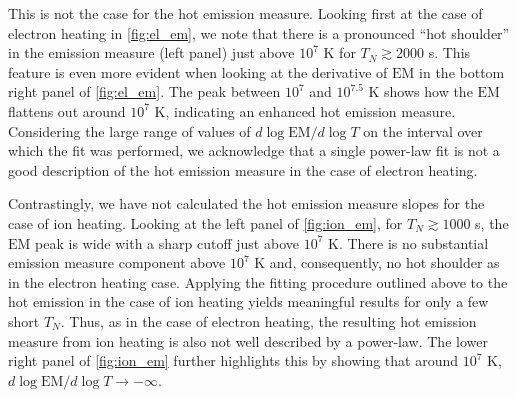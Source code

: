 \documentclass[apj]{emulateapj}
\begin{document}
	\par This is not the case for the hot emission measure. Looking first at the case of electron heating in \autoref{fig:el_em}, we note that there is a pronounced ``hot shoulder'' in the emission measure (left panel) just above $10^7$ K for $T_N\gtrsim2000$ s. This feature is even more evident when looking at the derivative of $\mathrm{EM}$ in the bottom right panel of \autoref{fig:el_em}. The peak between $10^7$ and $10^{7.5}$ K shows how the $\mathrm{EM}$ flattens out around $10^7$ K, indicating an enhanced hot emission measure. Considering the large range of values of $d\log{\mathrm{EM}}/d\log{T}$ on the interval over which the fit was performed, we acknowledge that a single power-law fit is not a good description of the hot emission measure in the case of electron heating.
	\par Contrastingly, we have not calculated the hot emission measure slopes for the case of ion heating. Looking at the left panel of \autoref{fig:ion_em}, for $T_N\gtrsim1000$ s, the $\mathrm{EM}$ peak is wide with a sharp cutoff just above $10^7$ K. There is no substantial emission measure component above $10^7$ K and, consequently, no hot shoulder as in the electron heating case. Applying the fitting procedure outlined above to the hot emission in the case of ion heating yields meaningful results for only a few short $T_N$. Thus, as in the case of electron heating, the resulting hot emission measure from ion heating is also not well described by a power-law. The lower right panel of \autoref{fig:ion_em} further highlights this by showing that around $10^7$ K, $d\log{\mathrm{EM}}/d\log{T}\to-\infty$.
\end{document}
